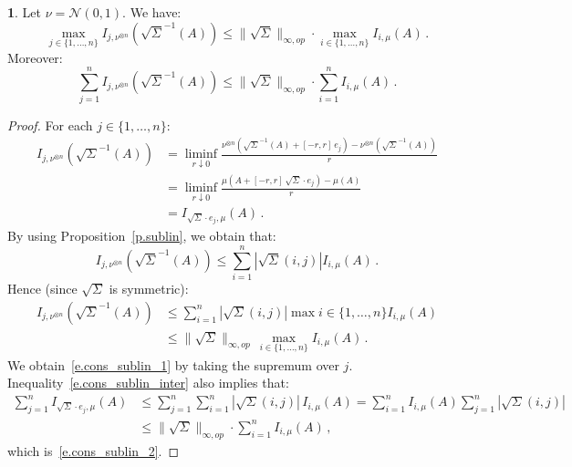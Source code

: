\documentclass[11pt]{article}
\theoremstyle{definition}
\newcommand{\enoncename}{}
\newtheorem{corpusenonce}[theo]{\enoncename}
\newenvironment{enonce}[1]{\renewcommand{\enoncename}{#1}\begin{corpusenonce}}{\end{corpusenonce}}
\numberwithin{equation}{section}
\begin{document}
\begin{enonce}{Claim}
Let $\nu = \mathcal{N}(0,1)$. We have:
\begin{equation}\label{e.cons_sublin_1}
\max_{j\in\lbrace 1,\dots, n\rbrace} I_{j,\nu^{\otimes n}}(\sqrt{\Sigma}^{-1} \left(A \right)) \leq \| \sqrt{\Sigma} \|_{\infty,op} \cdot \max_{i \in \lbrace 1,\dots, n \rbrace} I_{i,\mu}(A) \,.
\end{equation}
Moreover:
\begin{equation}\label{e.cons_sublin_2}
\sum_{j=1}^n I_{j,\nu^{\otimes n}}(\sqrt{\Sigma}^{-1} \left(A \right)) \leq \| \sqrt{\Sigma} \|_{\infty,op} \cdot \sum_{i=1}^n I_{i,\mu}(A) \,.
\end{equation}
\end{enonce}

\begin{proof}
For each $j\in\lbrace 1,\dots, n\rbrace$:
\begin{align*}
I_{j,\nu^{\otimes n}}(\sqrt{\Sigma}^{-1} \left(A \right)) & = \underset{r \downarrow 0}{\liminf} \frac{\nu^{\otimes n} \left(\sqrt{\Sigma}^{-1} \left(A \right) + [-r,r] \, e_j \right) - \nu^{\otimes n} \left(\sqrt{\Sigma}^{-1} \left(A \right) \right)}{r}\\
& = \underset{r \downarrow 0}{\liminf} \frac{\mu \left(A + [-r,r] \, \sqrt{\Sigma} \cdot e_j \right) - \mu \left(A \right)}{r}\\
& = I_{\sqrt{\Sigma} \cdot e_j,\mu}(A) \,.
\end{align*}
By using Proposition~\ref{p.sublin}, we obtain that:
\begin{equation}\label{e.cons_sublin_inter}
I_{j,\nu^{\otimes n}}(\sqrt{\Sigma}^{-1} \left(A \right)) \leq \sum_{i = 1}^n |\sqrt{\Sigma}(i,j)| I_{i,\mu}(A) \,.
\end{equation}
Hence (since $\sqrt{\Sigma}$ is symmetric):
\begin{align*}
I_{j,\nu^{\otimes n}}(\sqrt{\Sigma}^{-1} \left(A \right))& \leq \sum_{i = 1}^n |\sqrt{\Sigma}(i,j)| \max{i \in \lbrace 1,\dots, n \rbrace} I_{i,\mu}(A) \\
&\leq \|\sqrt{\Sigma} \|_{\infty,op} \, \max_{i \in \lbrace 1,\dots, n \rbrace} I_{i,\mu}(A) \,.
\end{align*}
We obtain~\eqref{e.cons_sublin_1} by taking the supremum over $j$. Inequality~\eqref{e.cons_sublin_inter} also implies that:
\begin{align*}
\sum_{j=1}^n I_{\sqrt{\Sigma} \cdot e_j,\mu}(A) & \leq \sum_{j=1}^n \sum_{i=1}^n |\sqrt{\Sigma}(i,j)| \, I_{i,\mu}(A)
 = \sum_{i=1}^n I_{i,\mu}(A) \sum_{j=1}^n |\sqrt{\Sigma}(i,j)|\\
& \leq \|\sqrt{\Sigma}\|_{\infty,op} \cdot \sum_{i=1}^n I_{i,\mu}(A) \,,
\end{align*}
which is~\eqref{e.cons_sublin_2}.
\end{proof}
\end{document}
